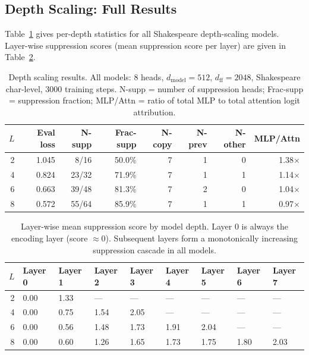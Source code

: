 \subsection{Depth Scaling: Full Results}
\label{app:depth_full}

Table~\ref{tab:depth_full} gives per-depth statistics for all Shakespeare depth-scaling models.
Layer-wise suppression scores (mean suppression score per layer) are given in
Table~\ref{tab:depth_cascade}.

\begin{table}[h]
\centering
\caption{Depth scaling results. All models: 8 heads, $d_{\text{model}}=512$, $d_{\text{ff}}=2048$,
Shakespeare char-level, 3000 training steps.
N-supp = number of suppression heads; Frac-supp = suppression fraction;
MLP/Attn = ratio of total MLP to total attention logit attribution.}
\label{tab:depth_full}
\begin{tabular}{rrrrrrrr}
\toprule
$L$ & Eval loss & N-supp & Frac-supp & N-copy & N-prev & N-other & MLP/Attn \\
\midrule
2 & 1.045 &  8/16 & 50.0\% & 7 & 1 & 0 & 1.38$\times$ \\
4 & 0.824 & 23/32 & 71.9\% & 7 & 1 & 1 & 1.14$\times$ \\
6 & 0.663 & 39/48 & 81.3\% & 7 & 2 & 0 & 1.04$\times$ \\
8 & 0.572 & 55/64 & 85.9\% & 7 & 1 & 1 & 0.97$\times$ \\
\bottomrule
\end{tabular}
\end{table}

\begin{table}[h]
\centering
\caption{Layer-wise mean suppression score by model depth. Layer 0 is always the encoding
layer (score $\approx 0$). Subsequent layers form a monotonically increasing suppression
cascade in all models.}
\label{tab:depth_cascade}
\begin{tabular}{rllllllll}
\toprule
$L$ & Layer 0 & Layer 1 & Layer 2 & Layer 3 & Layer 4 & Layer 5 & Layer 6 & Layer 7 \\
\midrule
2 & 0.00 & 1.33 & — & — & — & — & — & — \\
4 & 0.00 & 0.75 & 1.54 & 2.05 & — & — & — & — \\
6 & 0.00 & 0.56 & 1.48 & 1.73 & 1.91 & 2.04 & — & — \\
8 & 0.00 & 0.60 & 1.26 & 1.65 & 1.73 & 1.75 & 1.80 & 2.03 \\
\bottomrule
\end{tabular}
\end{table}

